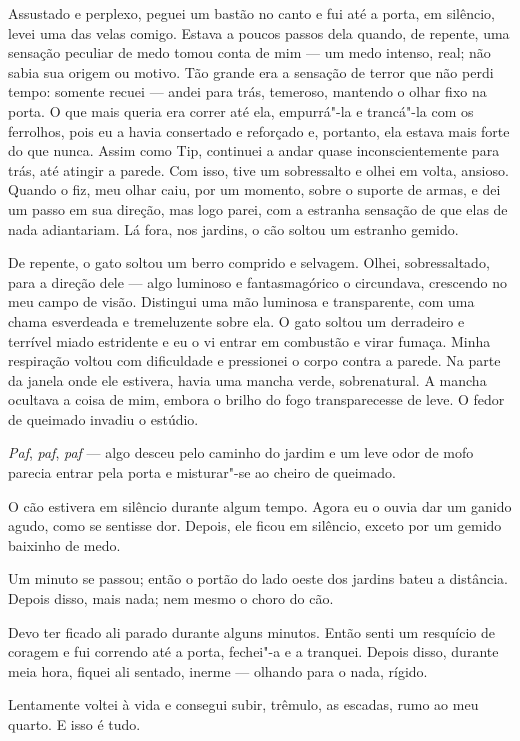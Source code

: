Assustado e perplexo, peguei um bastão no canto e fui até a porta, em silêncio, levei uma das velas comigo. Estava a
poucos passos dela quando, de repente, uma sensação peculiar de medo tomou conta de mim --- um medo intenso, real; não
sabia sua origem ou motivo. Tão grande era a sensação de terror que não perdi tempo: somente recuei --- andei para
trás, temeroso, mantendo o olhar fixo na porta. O que mais queria era correr até ela, empurrá"-la e trancá"-la com os
ferrolhos, pois eu a havia consertado e reforçado e, portanto, ela estava mais forte do que nunca. Assim como Tip,
continuei a andar quase inconscientemente para trás, até atingir a parede. Com isso, tive um sobressalto e olhei em
volta, ansioso. Quando o fiz, meu olhar caiu, por um momento, sobre o suporte de armas, e dei um passo em sua direção,
mas logo parei, com a estranha sensação de que elas de nada adiantariam. Lá fora, nos jardins, o cão soltou um estranho
gemido.

De repente, o gato soltou um berro comprido e selvagem. Olhei, sobressaltado, para a direção dele --- algo luminoso e
fantasmagórico o circundava, crescendo no meu campo de visão. Distingui uma mão luminosa e transparente, com uma chama
esverdeada e tremeluzente sobre ela. O gato soltou um derradeiro e terrível miado estridente e eu o vi entrar em
combustão e virar fumaça. Minha respiração voltou com dificuldade e pressionei o corpo contra a parede. Na parte da janela
onde ele estivera, havia uma mancha verde, sobrenatural. A mancha ocultava a coisa de mim, embora o brilho do fogo
transparecesse de leve. O fedor de queimado invadiu o estúdio. 

\textit{Paf}, \textit{paf}, \textit{paf }--- algo desceu pelo caminho do jardim e um leve odor de mofo parecia entrar
pela porta e misturar"-se ao cheiro de queimado.

O cão estivera em silêncio durante algum tempo. Agora eu o ouvia dar um ganido agudo, como se sentisse
dor. Depois, ele ficou em silêncio, exceto por um gemido baixinho de medo.

Um minuto se passou; então o portão do lado oeste dos jardins bateu a distância. Depois disso, mais nada; nem mesmo o
choro do cão.

Devo ter ficado ali parado durante alguns minutos. Então senti um resquício de coragem e fui correndo até a porta,
fechei"-a e a tranquei. Depois disso, durante meia hora, fiquei ali sentado, inerme --- olhando para o nada, rígido.

Lentamente voltei à vida e consegui subir, trêmulo, as escadas, rumo ao meu quarto. E isso é tudo.


